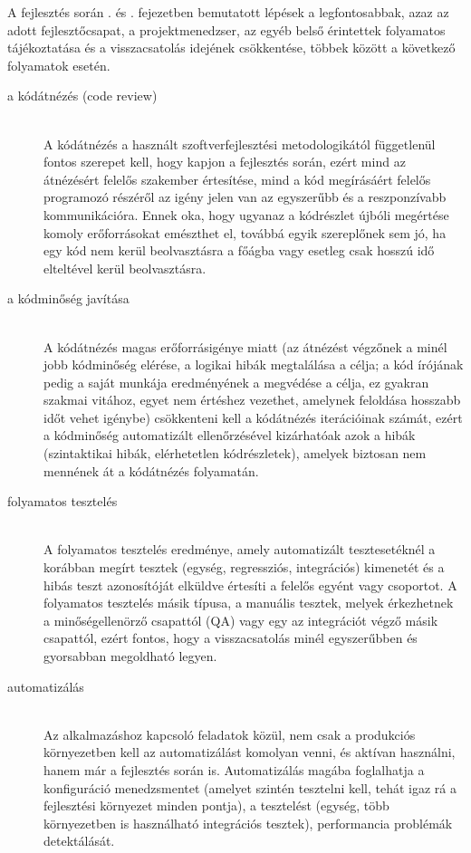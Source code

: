 A fejlesztés során . és . fejezetben bemutatott lépések a legfontosabbak, azaz az adott fejlesztőcsapat, a projektmenedzser, az egyéb belső érintettek folyamatos tájékoztatása és a visszacsatolás idejének csökkentése, többek között a következő folyamatok esetén.
\begin{description}
  \item[a kódátnézés (code review)]\hfill\\
  A kódátnézés a használt szoftverfejlesztési metodologikától függetlenül fontos szerepet kell, hogy kapjon a fejlesztés során, ezért mind az átnézésért felelős szakember értesítése, mind a kód megírásáért felelős programozó részéről az igény jelen van az egyszerűbb és a reszponzívabb kommunikációra. Ennek oka, hogy ugyanaz a kódrészlet újbóli megértése komoly erőforrásokat emészthet el, továbbá egyik szereplőnek sem jó, ha egy kód nem kerül beolvasztásra a főágba vagy esetleg csak hosszú idő elteltével kerül beolvasztásra.
  \item[a kódminőség javítása]\hfill\\
  A kódátnézés magas erőforrásigénye miatt (az átnézést végzőnek a minél jobb kódminőség elérése, a logikai hibák megtalálása a célja; a kód írójának pedig a saját munkája eredményének a megvédése a célja, ez gyakran szakmai vitához, egyet nem értéshez vezethet, amelynek feloldása hosszabb időt vehet igénybe) csökkenteni kell a kódátnézés iterációinak számát, ezért a kódminőség automatizált ellenőrzésével kizárhatóak azok a hibák (szintaktikai hibák, elérhetetlen kódrészletek), amelyek biztosan nem mennének át a kódátnézés folyamatán.
  \item[folyamatos tesztelés]\hfill\\
  A folyamatos tesztelés eredménye, amely automatizált tesztesetéknél a korábban megírt tesztek (egység, regressziós, integrációs) kimenetét és a hibás teszt azonosítóját elküldve értesíti a felelős egyént vagy csoportot. A folyamatos tesztelés másik típusa, a manuális tesztek, melyek érkezhetnek a minőségellenörző csapattól (QA) vagy egy az integrációt végző másik csapattól, ezért fontos, hogy a visszacsatolás minél egyszerűbben és gyorsabban megoldható legyen.
  \item[automatizálás]\hfill\\
  Az alkalmazáshoz kapcsoló feladatok közül, nem csak a produkciós környezetben kell az automatizálást komolyan venni, és aktívan használni, hanem már a fejlesztés során is. Automatizálás magába foglalhatja a konfiguráció menedzsmentet (amelyet szintén tesztelni kell, tehát igaz rá a fejlesztési környezet minden pontja), a tesztelést (egység, több környezetben is használható integrációs tesztek), performancia problémák detektálását.
\end{description}

